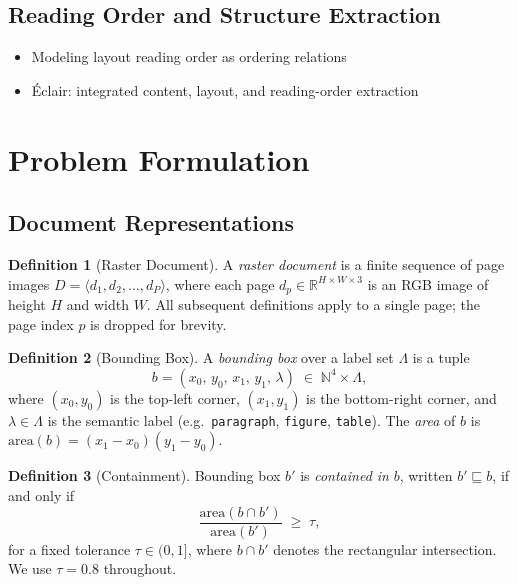 \documentclass{article}
\theoremstyle{definition}
\newtheorem{definition}{Definition}[section]
\begin{document}
\subsection{Reading Order and Structure Extraction}
\begin{itemize}
  \item Modeling layout reading order as ordering relations \cite{zhang2024modeling}
  \item \'{E}clair: integrated content, layout, and reading-order extraction
        \cite{eclair2025extracting}
\end{itemize}

\section{Problem Formulation}

\subsection{Document Representations}

\begin{definition}[Raster Document]
  A \emph{raster document} is a finite sequence of page images
  $D = \langle d_1, d_2, \ldots, d_P \rangle$, where each page
  $d_p \in \mathbb{R}^{H \times W \times 3}$ is an RGB image of height $H$
  and width $W$.  All subsequent definitions apply to a single page; the
  page index $p$ is dropped for brevity.
\end{definition}

\begin{definition}[Bounding Box]
  A \emph{bounding box} over a label set $\Lambda$ is a tuple
  \[
    b = (x_0,\, y_0,\, x_1,\, y_1,\, \lambda)
    \;\in\; \mathbb{N}^4 \times \Lambda,
  \]
  where $(x_0, y_0)$ is the top-left corner, $(x_1, y_1)$ is the
  bottom-right corner, and $\lambda \in \Lambda$ is the semantic label
  (e.g.\ \texttt{paragraph}, \texttt{figure}, \texttt{table}).
  The \emph{area} of $b$ is $\mathrm{area}(b) = (x_1 - x_0)(y_1 - y_0)$.
\end{definition}

\begin{definition}[Containment]
  Bounding box $b'$ is \emph{contained in} $b$, written $b' \sqsubseteq b$,
  if and only if
  \[
    \frac{\mathrm{area}(b \cap b')}{\mathrm{area}(b')} \;\ge\; \tau,
  \]
  for a fixed tolerance $\tau \in (0, 1]$, where $b \cap b'$ denotes the
  rectangular intersection.  We use $\tau = 0.8$ throughout.
\end{definition}
\end{document}

